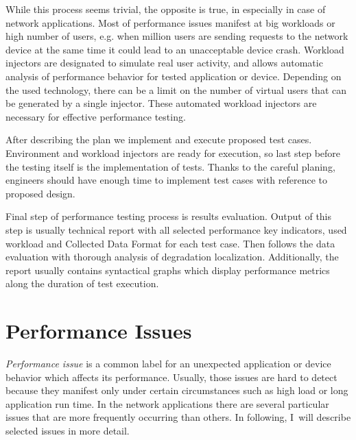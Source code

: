 While this process seems trivial, the opposite is true, in especially in case of network applications. Most of performance issues manifest at big workloads or high number of users, e.g. when million users are sending requests to the network device at the same time it could lead to an unacceptable device crash. Workload injectors are designated to simulate real user activity, and allows automatic analysis of performance behavior for tested application or device. Depending on the used technology, there can be a limit on the number of virtual users that can be generated by a single injector. These automated workload injectors are necessary for effective performance testing.

After describing the plan we implement and execute proposed test cases. Environment and workload injectors are ready for execution, so last step before the testing itself is the implementation of tests. Thanks to the careful planing, engineers should have enough time to implement test cases with reference to proposed design. 

Final step of performance testing process is results evaluation. Output of this step is usually technical report with all selected performance key indicators, used workload and Collected Data Format for each test case. Then follows the data evaluation with thorough analysis of degradation localization. Additionally, the report usually contains syntactical graphs which display performance metrics along the duration of test execution.

\section{Performance Issues}
\label{Performance Issues}
\emph{Performance issue} is a common label for an unexpected application or device behavior which affects its performance. Usually, those issues are hard to detect because they manifest only under certain circumstances such as high load or long application run time. In the network applications there are several particular issues that are more frequently occurring  than others. In following, I~will describe selected issues in more detail.

